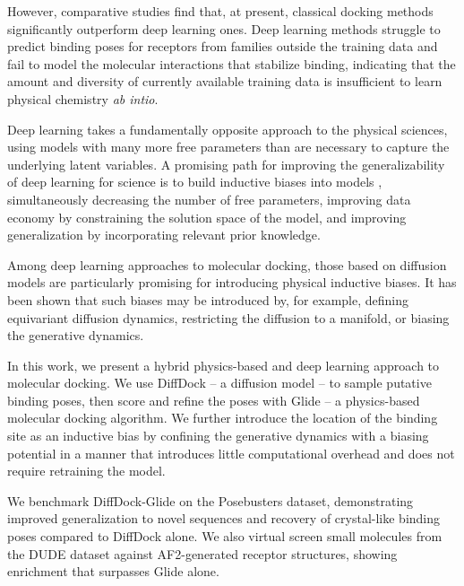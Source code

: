 \documentclass[%
 aip,
 amsmath,amssymb,
 reprint,%
]{revtex4-1}
\begin{document}
However, comparative studies find that, at present, classical docking methods significantly outperform deep learning ones. Deep learning methods struggle to predict binding poses for receptors from families outside the training data\cite{buttenschoen2024posebusters} and fail to model the molecular interactions that stabilize binding\cite{errington2024plif}, indicating that the amount and diversity of currently available training data is insufficient to learn physical chemistry {\it ab intio}.

Deep learning takes a fundamentally opposite approach to the physical sciences, using models with many more free parameters than are necessary to capture the underlying latent variables. A promising path for improving the generalizability of deep learning for science is to build inductive biases into models \cite{behler2007neuralnetworkpotentials,fuchs2020equivariance,musaelian2023allegro}, simultaneously decreasing the number of free parameters, improving data economy by constraining the solution space of the model, and improving generalization by incorporating relevant prior knowledge.

Among deep learning approaches to molecular docking, those based on diffusion models are particularly promising for introducing physical inductive biases. It has been shown that such biases may be introduced by, for example, defining equivariant diffusion dynamics\cite{hoogeboom2022equivariant}, restricting the diffusion to a manifold\cite{jing2022torsional,de2022riemannian}, or biasing the generative dynamics\cite{corso2023particle}. 



In this work, we present a hybrid physics-based and deep learning approach to molecular docking. We use DiffDock\cite{corso2022diffdock} -- a diffusion model -- to sample putative binding poses, then score and refine the poses with Glide\cite{friesner2004glide} -- a physics-based molecular docking algorithm. We further introduce the location of the binding site as an inductive bias by confining the generative dynamics with a biasing potential in a manner that introduces little computational overhead and does not require retraining the model.

We benchmark DiffDock-Glide on the Posebusters dataset, demonstrating improved generalization to novel sequences and recovery of crystal-like binding poses compared to DiffDock alone. We also virtual screen small molecules from the DUDE\cite{mysinger2012dude} dataset against AF2-generated receptor structures, showing enrichment that surpasses Glide alone.
\end{document}
